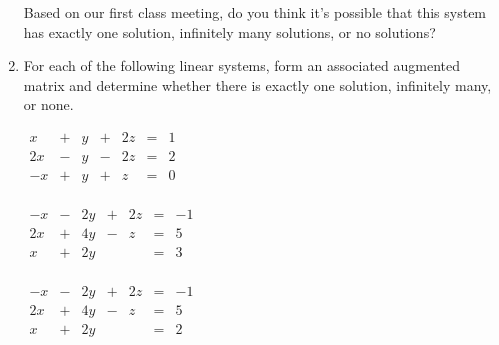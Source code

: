 \documentclass[12pt]{article}
\newcommand{\ds}{\displaystyle}
\newcommand{\vs}[1]{\vspace{#1in}}
\begin{document}
\begin{enumerate}
   \vs{0.75}
   Based on our first class meeting,
   do you think it's possible that this
   system has exactly one solution, infinitely many
   solutions, or no solutions?  

   \vs{0.75}

   \newpage
\item For each of the following linear systems, form an associated
  augmented matrix and determine whether there is exactly one
  solution, infinitely many, or none.

  \bigskip
  $\ds
  \begin{alignedat}{4}
    x &  {}+{}  & y &  {}+{}  & 2z &  {}={}  & 1 \\
    2x &  {}-{}  & y &  {}-{}  & 2z &  {}={}  & 2 \\
    -x &  {}+{}  & y &  {}+{}  & z &  {}={}  & 0 \\
  \end{alignedat}
  $
      
  \vs{3}

  $\ds
  \begin{alignedat}{4}
    -x &  {}-{}  & 2y &  {}+{}  & 2z &  {}={}  & -1 \\
    2x &  {}+{}  & 4y &  {}-{}  & z &  {}={}  & 5 \\
    x &  {}+{}  & 2y &  &  &  {}={}  & 3 \\
  \end{alignedat}
  $

  \vs{3}
  \newpage
  $\ds
  \begin{alignedat}{4}
    -x &  {}-{}  & 2y &  {}+{}  & 2z &  {}={}  & -1 \\
    2x &  {}+{}  & 4y &  {}-{}  & z &  {}={}  & 5 \\
    x &  {}+{}  & 2y &  &  &  {}={}  & 2 \\
  \end{alignedat}
  $



\end{enumerate}
\end{document}
